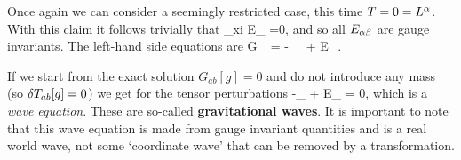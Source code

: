 \bcl 
    Once again we can consider a seemingly restricted case, this time $T=0 = L^{\alpha}$. 
\ecl 
With this claim it follows trivially that 
\bse 
    \Delta_{xi} E_{\a\beta} =0,
\ese 
and so all $E_{\alpha\beta}$ are gauge invariants. The left-hand side equations are 
\bse 
    \del G_{\a\beta} = - _{\a\beta} + \Delta E_{\a\beta}.
\ese

\br 
    If we start from the exact solution $G_{ab}[g]=0$ and do not introduce any mass (so $\delta T_{ab}[g]=0$) we get for the tensor perturbations 
    \bse 
        -_{\a\beta} + \Delta E_{\a\beta} = 0,
    \ese 
    which is a \textit{wave equation}. These are so-called \textbf{gravitational waves}. It is important to note that this wave equation is made from gauge invariant quantities and is a real world wave, not some `coordinate wave' that can be removed by a transformation.
\er 